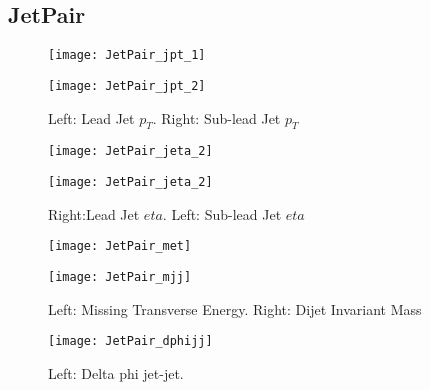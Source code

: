 \documentclass[a4paper,10pt]{article}
\begin{document}
\clearpage
\subsection{JetPair}  
              
\begin{figure}[!h]
\centering
\begin{minipage}[!h]{0.4\linewidth}
\centering
\texttt{[image: JetPair\_jpt\_1]}
\end{minipage}%
\begin{minipage}[!h]{0.4\linewidth}
  \texttt{[image: JetPair\_jpt\_2]}
\end{minipage}
\caption{Left: Lead Jet $p_T$. Right: Sub-lead Jet $p_T$}
\end{figure}

\begin{figure}[!h]
\centering
\begin{minipage}[!h]{0.4\linewidth}
\centering
\texttt{[image: JetPair\_jeta\_2]}
\end{minipage}%
\begin{minipage}[!h]{0.4\linewidth}
\centering
\texttt{[image: JetPair\_jeta\_2]}
\end{minipage}
\caption{Right:Lead Jet $eta$. Left: Sub-lead Jet $eta$}
\end{figure}

\begin{figure}[!h]
\centering
\begin{minipage}[!h]{0.4\linewidth}
\centering
\texttt{[image: JetPair\_met]}
\end{minipage}%
\begin{minipage}[!h]{0.4\linewidth}
\centering
\texttt{[image: JetPair\_mjj]}
\end{minipage}
\caption{Left: Missing Transverse Energy. Right: Dijet Invariant Mass}
\end{figure}

\begin{figure}[!h]
\centering
\begin{minipage}[!h]{0.4\linewidth}
\centering
\texttt{[image: JetPair\_dphijj]}
\end{minipage}%
\begin{minipage}[!h]{0.4\linewidth}
\centering
\end{minipage}
\caption{Left: Delta phi jet-jet.}
\end{figure}
\end{document}
